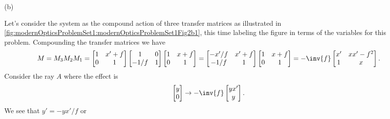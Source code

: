 {\begin{enumerate}

as expected.

\item[(b)]

Let's consider the system as the compound action of three transfer matrices as illustrated in \cref{fig:modernOpticsProblemSet1:modernOpticsProblemSet1Fig2b1}, this time labeling the figure in terms of the variables for this problem.
%
%
Compounding the transfer matrices we have
%
\begin{dmath}\label{eqn:modernOpticsProblemSet1P1:1510}
M
= M_3 M_2 M_1
=
\begin{bmatrix}
1 & x' + f \\
0 & 1
\end{bmatrix}
\begin{bmatrix}
1 & 0 \\
-1/f & 1
\end{bmatrix}
\begin{bmatrix}
1 & x + f \\
0 & 1
\end{bmatrix}
=
\begin{bmatrix}
-x'/f & x' + f \\
-1/f & 1
\end{bmatrix}
\begin{bmatrix}
1 & x + f \\
0 & 1
\end{bmatrix}
=
-\inv{f}
\begin{bmatrix}
x' & x x' - f^2 \\
1 & x
\end{bmatrix}.
\end{dmath}
%
Consider the ray \(A\) where the effect is
%
\begin{dmath}\label{eqn:modernOpticsProblemSet1P1:1530}
\begin{bmatrix}
y \\
0
\end{bmatrix}
\rightarrow
-\inv{f}
\begin{bmatrix}
y x' \\
y
\end{bmatrix}.
\end{dmath}
%
We see that \(y' = -y x'/f\) or



\end{enumerate}}
